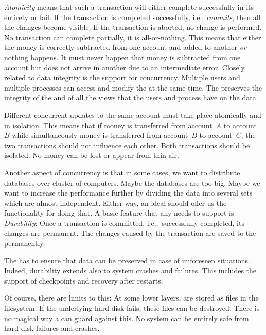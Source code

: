 \emph{Atomicity} means that such a transaction will either complete successfully in its entirety or fail.
If the transaction is completed successfully, i.e., \emph{commits}, then all the changes become visible.
If the transaction is aborted, no change is performed.
No transaction can complete partially, it is all-or-nothing.
This means that either the money is correctly subtracted from one account and added to another \emph{or} nothing happens.
It must never happen that money is subtracted from one account but does not arrive in another due to an intermediate error.%
\endhsection%
%
%
Closely related to data integrity is the support for concurrency.
Multiple users and multiple processes can access and modify the  at the same time.
The  preserves the integrity of the  and of all the views that the users and process have on the data.

Different concurrent updates to the same account must take place atomically and in isolation.
This means that if money is transferred from account~$A$ to account~$B$ while simultaneously money is transferred from account~$B$ to account~$C$, the two transactions should not influence each other.
Both transactions should be isolated.
No money can be lost or appear from thin air.

Another aspect of concurrency is that in some cases, we want to distribute databases over cluster of computers.
Maybe the databases are too big.
Maybe we want to increase the performance further by dividing the data into several sets which are almost independent.
Either way, an ideal  should offer us the functionality for doing that.%
\endhsection%
%
%
%
A basic feature that any  needs to support is \emph{Durability}:
Once a transaction is committed, i.e.,~successfully completed, its changes are permanent.
The changes caused by the transaction are saved to the  permanently.

The  has to ensure that data can be preserved in case of unforeseen situations.
Indeed, durability extends also to system crashes and failures.
This includes the support of checkpoints and recovery after restarts.

Of course, there are limits to this:
At some lower layers,  are stored as files in the filesystem.
If the underlying hard disk fails, these files can be destroyed.
There is no magical way a  can guard against this.
No system can be entirely safe from hard disk failures and crashes.

